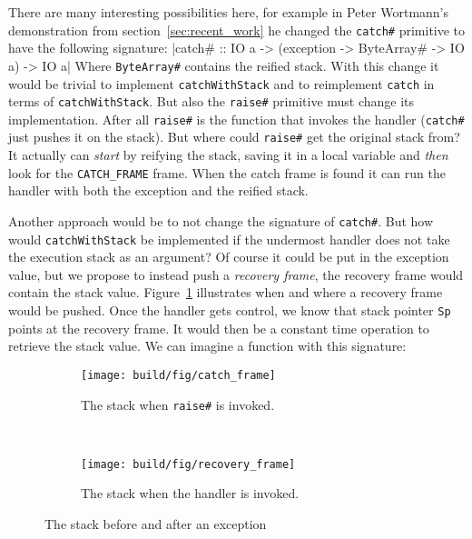There are many interesting possibilities here, for example in Peter
Wortmann's demonstration from section~\ref{sec:recent_work} he changed the
\texttt{catch\#} primitive to have the following signature:
|catch# :: IO a -> (exception -> ByteArray# -> IO a) -> IO a|
Where \texttt{ByteArray\#} contains the reified stack. With this change
it would be trivial to implement \texttt{catchWithStack} and
to reimplement \texttt{catch} in terms of \texttt{catchWithStack}. But
also the \texttt{raise\#} primitive must change its implementation. After
all \texttt{raise\#} is the function that invokes the handler
(\texttt{catch\#} just pushes it on the stack). But where could
\texttt{raise\#} get the original stack from? It actually can \emph{start} by
reifying the stack, saving it in a local variable and \emph{then} look
for the \texttt{CATCH\_FRAME} frame. When the catch frame is found it
can run the handler with both the exception and the reified stack.

Another approach would be to not change the signature of
\texttt{catch\#}. But how would \texttt{catchWithStack} be implemented if
the undermost handler does not take the execution stack as an argument?
Of course it could be put in the exception value, but we propose to
instead push a \emph{recovery frame}, the recovery frame would contain
the stack value. Figure~\ref{fig:recovery_frame} illustrates when and
where a recovery frame would be pushed. Once the handler
gets control, we know that stack pointer \texttt{Sp} points
at the recovery frame. It would then be a constant time operation to
retrieve the stack value. We can imagine a function with this
signature:

\begin{figure}
\begin{mdframed}
  \begin{subfigure}[t]{0.5\textwidth}
    \texttt{[image: build/fig/catch\_frame]}
    \caption{The stack when \texttt{raise\#} is invoked.}
  \end{subfigure}
        ~ %
  \begin{subfigure}[t]{0.5\textwidth}
    \texttt{[image: build/fig/recovery\_frame]}
    \caption{The stack when the handler is invoked.}
  \end{subfigure}
  \caption{The stack before and after an exception}
  \label{fig:recovery_frame}
\end{mdframed}
\end{figure}


